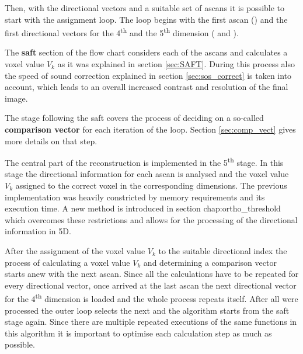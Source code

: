 Then, with the directional vectors and a suitable set of \acp{ascan} it is possible to start with the assignment loop. The loop begins with the first \ac{ascan} () and the first directional vectors for the 4\textsuperscript{th} and the 5\textsuperscript{th} dimension ( and ). 

The \textbf{\ac{saft}} section of the flow chart considers each of the \acp{ascan} and calculates a voxel value $V_k$ as it was explained in section \ref{sec:SAFT}. During this process also the speed of sound correction explained in section \ref{sec:sos_correct} is taken into account, which leads to an overall increased contrast and resolution of the final image.  

The stage following the \ac{saft} covers the process of deciding on a so-called \textbf{comparison vector} for each iteration of the loop. Section \ref{sec:comp_vect} gives more details on that step.


The central part of the reconstruction is implemented in the 5\textsuperscript{th} stage. In this stage the directional information for each \ac{ascan} is analysed and the voxel value $V_k$ assigned to the correct voxel in the corresponding dimensions. The previous implementation was heavily constricted by memory requirements and its  execution time. A new method is introduced in section \ac{chap:ortho_threshold} which overcomes these restrictions and allows for the processing of the directional information in 5D.   

After the assignment of the voxel value $V_k$ to the suitable directional index the process of calculating a voxel value $V_k$ and determining a comparison vector starts anew with the next \ac{ascan}.
Since all the calculations have to be repeated for every directional vector, once arrived at the last \ac{ascan} the next directional vector for the 4\textsuperscript{th} dimension is loaded and the whole process repeats itself. After all  were processed the outer loop selects the next  and the algorithm starts from the \ac{saft} stage again. Since there are multiple repeated executions of the same functions in this algorithm it is important to optimise each calculation step as much as possible. 



